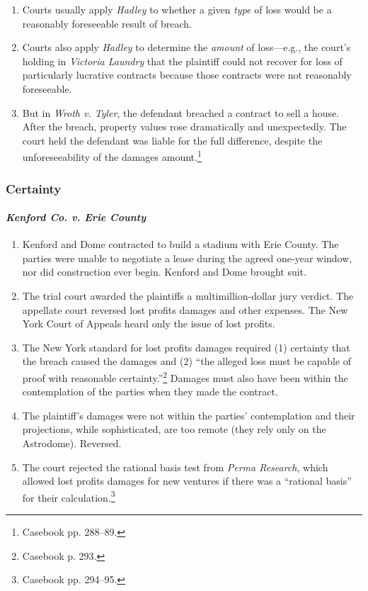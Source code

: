 \begin{enumerate}
    \item Courts usually apply \emph{Hadley} to whether a given \emph{type} of 
    loss would be a reasonably foreseeable result of breach.
    \item Courts also apply \emph{Hadley} to determine the \emph{amount} of 
    loss---e.g., the court's holding in \emph{Victoria Laundry} that the 
    plaintiff could not recover for loss of particularly lucrative contracts 
    because those contracts were not reasonably foreseeable.
    \item But in \emph{Wroth v. Tyler}, the defendant breached a contract to 
    sell a house. After the breach, property values rose dramatically and 
    unexpectedly. The court held the defendant was liable for the full 
    difference, despite the unforeseeability of the damages 
    amount.\footnote{Casebook pp. 288--89.}
\end{enumerate}

\subsubsection{Certainty}

\paragraph{\emph{Kenford Co. v. Erie County}}

\begin{enumerate}
    \item Kenford and Dome contracted to build a stadium with Erie County. 
    The parties were unable to negotiate a lease during the agreed one-year 
    window, nor did construction ever begin. Kenford and Dome brought suit.
    \item The trial court awarded the plaintiffs a multimillion-dollar jury 
    verdict. The appellate court reversed lost profits damages and other 
    expenses. The New York Court of Appeals heard only the issue of lost 
    profits.
    \item The New York standard for lost profits damages required (1) 
    certainty that the breach caused the damages and (2) ``the alleged loss 
    must be capable of proof with reasonable certainty.''\footnote{Casebook p. 
    293.} Damages must also have been within the contemplation of the parties 
    when they made the contract.
    \item The plaintiff's damages were not within the parties' contemplation 
    and their projections, while sophisticated, are too remote (they rely only 
    on the Astrodome). Reversed.
    \item The court rejected the rational basis test from \emph{Perma 
    Research}, which allowed lost profits damages for new ventures if there 
    was a ``rational basis'' for their calculation.\footnote{Casebook pp. 
    294--95.}
\end{enumerate}

